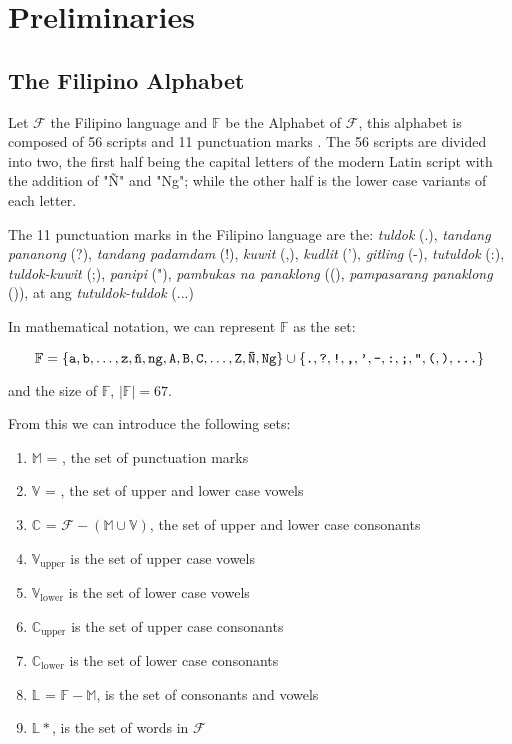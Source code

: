 \section{Preliminaries}
\subsection{The Filipino Alphabet}

Let \(\mathcal{F}\) the Filipino language
and \(\mathbb{F}\) be the Alphabet of \(\mathcal{F}\), this alphabet is
composed of 56 scripts and 11 punctuation marks \cite{OOP}. The 56 scripts are divided into
two, the first half being the capital letters of the modern Latin script with
the addition of "Ñ" and "Ng"; while the other half is the lower case variants
of each letter.

The 11 punctuation marks in the Filipino language are the: \textit{tuldok} (.),
\textit{tandang pananong} (?), \textit{tandang padamdam} (!), \textit{kuwit} (,),
\textit{kudlit} ('), \textit{gitling} (-), \textit{tutuldok} (:),
\textit{tuldok-kuwit} (;), \textit{panipi} ("), \textit{pambukas na panaklong}
((), \textit{pampasarang panaklong} ()), at ang \textit{tutuldok-tuldok} (...)

In mathematical notation, we can represent \(\mathbb{F}\) as the set:

\[
    \mathbb{F} = \{\texttt{a}, \texttt{b}, \dots, \texttt{z}, \texttt{ñ}, \texttt{ng}, \\
    \texttt{A}, \texttt{B}, \texttt{C}, \dots, \texttt{Z}, \texttt{Ñ}, \texttt{Ng}\} \\
    \cup \{\texttt{.}, \texttt{?}, \texttt{!}, \texttt{,}, \texttt{'}, \texttt{-}, \texttt{:}, \\
    \texttt{;}, \texttt{"}, \texttt{(}, \texttt{)}, \texttt{\ldots}\}
\]

and the size of \(\mathbb{F}\), \(\left|\mathbb{F}\right| = 67\).

From this we can introduce the following sets:
\begin{enumerate}
    \item \(\mathbb{M}\) = , the set of punctuation marks
    \item \(\mathbb{V}\) = , the set of upper and lower case vowels
    \item \(\mathbb{C}\) = \(\mathcal{F} - (\mathbb{M}\cup\mathbb{V})\),
          the set of upper and lower case consonants
    \item \(\mathbb{V}_\text{upper}\) is the set of upper case vowels
    \item \(\mathbb{V}_\text{lower}\) is the set of lower case vowels
    \item \(\mathbb{C}_\text{upper}\) is the set of upper case consonants
    \item \(\mathbb{C}_\text{lower}\) is the set of lower case consonants
    \item \(\mathbb{L}\) = \(\mathbb{F} - \mathbb{M}\), is the set of consonants and vowels
    \item \(\mathbb{L}*\), is the set of words in \(\mathcal{F}\)
\end{enumerate}

